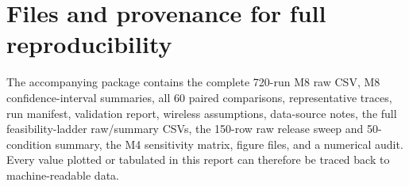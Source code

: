 \documentclass[11pt]{article}
\begin{document}


\section{Files and provenance for full reproducibility}
The accompanying package contains the complete 720-run M8 raw CSV, M8 confidence-interval summaries, all 60 paired comparisons, representative traces, run manifest, validation report, wireless assumptions, data-source notes, the full feasibility-ladder raw/summary CSVs, the 150-row raw release sweep and 50-condition summary, the M4 sensitivity matrix, figure files, and a numerical audit. Every value plotted or tabulated in this report can therefore be traced back to machine-readable data.
\end{document}
